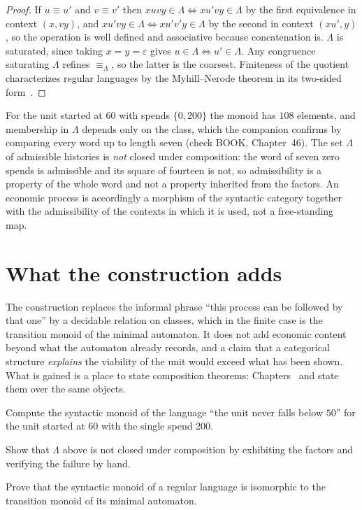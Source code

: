 \begin{proof}
If $u\equiv u'$ and $v\equiv v'$ then $xuvy\in\Lambda\Leftrightarrow xu'vy\in\Lambda$ by the first equivalence in context $(x,vy)$, and $xu'vy\in\Lambda\Leftrightarrow xu'v'y\in\Lambda$ by the second in context $(xu',y)$, so the operation is well defined and associative because concatenation is. $\Lambda$ is saturated, since taking $x=y=\varepsilon$ gives $u\in\Lambda\Leftrightarrow u'\in\Lambda$. Any congruence saturating $\Lambda$ refines $\equiv_\Lambda$, so the latter is the coarsest. Finiteness of the quotient characterizes regular languages by the Myhill--Nerode theorem in its two-sided form~\cite{nerode1958}.
\end{proof}

For the unit started at $60$ with spends $\{0,200\}$ the monoid has $108$ elements, and membership in $\Lambda$ depends only on the class, which the companion confirms by comparing every word up to length seven (check BOOK, Chapter~46). The set $\Lambda$ of admissible histories is \emph{not} closed under composition: the word of seven zero spends is admissible and its square of fourteen is not, so admissibility is a property of the whole word and not a property inherited from the factors. An economic process is accordingly a morphism of the syntactic category together with the admissibility of the contexts in which it is used, not a free-standing map.

\section{What the construction adds}

The construction replaces the informal phrase ``this process can be followed by that one'' by a decidable relation on classes, which in the finite case is the transition monoid of the minimal automaton. It does not add economic content beyond what the automaton already records, and a claim that a categorical structure \emph{explains} the viability of the unit would exceed what has been shown. What is gained is a place to state composition theorems: Chapters~ and  state them over the same objects.

\begin{exercise}Compute the syntactic monoid of the language ``the unit never falls below $50$'' for the unit started at $60$ with the single spend $200$.\end{exercise}
\begin{exercise}Show that $\Lambda$ above is not closed under composition by exhibiting the factors and verifying the failure by hand.\end{exercise}
\begin{exercise}Prove that the syntactic monoid of a regular language is isomorphic to the transition monoid of its minimal automaton.\end{exercise}

